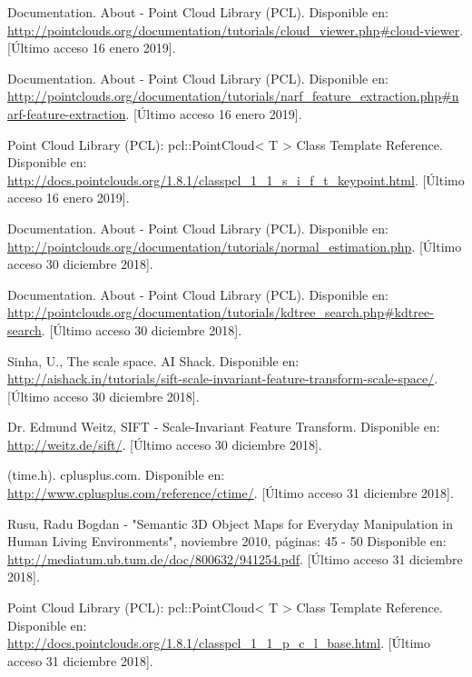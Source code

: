 \begin{thebibliography}{99}
 Documentation. About - Point Cloud Library (PCL). Disponible en: \url{http://pointclouds.org/documentation/tutorials/cloud_viewer.php#cloud-viewer}. [Último acceso 16 enero 2019].

 Documentation. About - Point Cloud Library (PCL). Disponible en: \url{http://pointclouds.org/documentation/tutorials/narf_feature_extraction.php#narf-feature-extraction}. [Último acceso 16 enero 2019].

 Point Cloud Library (PCL): pcl::PointCloud< T > Class Template Reference. Disponible en: \url{http://docs.pointclouds.org/1.8.1/classpcl_1_1_s_i_f_t_keypoint.html}. [Último acceso 16 enero 2019].


 Documentation. About - Point Cloud Library (PCL). Disponible en: \url{http://pointclouds.org/documentation/tutorials/normal_estimation.php}. [Último acceso 30 diciembre 2018].


 Documentation. About - Point Cloud Library (PCL). Disponible en: \url{http://pointclouds.org/documentation/tutorials/kdtree_search.php#kdtree-search}. [Último acceso 30 diciembre 2018].


 Sinha, U., The scale space. AI Shack. Disponible en: \url{http://aishack.in/tutorials/sift-scale-invariant-feature-transform-scale-space/}. [Último acceso 30 diciembre 2018].


Dr. Edmund Weitz, SIFT - Scale-Invariant Feature Transform. Disponible en: \url{http://weitz.de/sift/}. [Último acceso 30 diciembre 2018].





(time.h). cplusplus.com. Disponible en: \url{http://www.cplusplus.com/reference/ctime/}. [Último acceso 31 diciembre 2018].



Rusu, Radu Bogdan - "Semantic 3D Object Maps for Everyday Manipulation in Human Living Environments", noviembre 2010, páginas: 45 - 50 Disponible en: \url{http://mediatum.ub.tum.de/doc/800632/941254.pdf}. [Último acceso 31 diciembre 2018].


 Point Cloud Library (PCL): pcl::PointCloud< T > Class Template Reference. Disponible en: \url{http://docs.pointclouds.org/1.8.1/classpcl_1_1_p_c_l_base.html}. [Último acceso 31 diciembre 2018].


\end{thebibliography}
